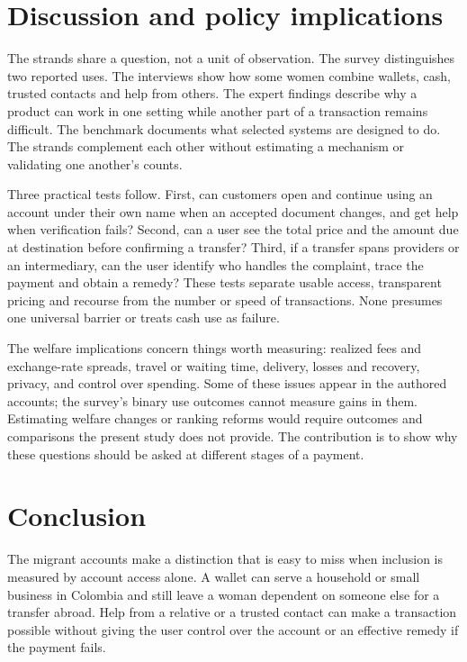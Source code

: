 \documentclass[12pt]{article}
\begin{document}
\section{Discussion and policy implications}
The strands share a question, not a unit of observation. The survey distinguishes two reported uses. The interviews show how some women combine wallets, cash, trusted contacts and help from others. The expert findings describe why a product can work in one setting while another part of a transaction remains difficult. The benchmark documents what selected systems are designed to do. The strands complement each other without estimating a mechanism or validating one another's counts.

Three practical tests follow. First, can customers open and continue using an account under their own name when an accepted document changes, and get help when verification fails? Second, can a user see the total price and the amount due at destination before confirming a transfer? Third, if a transfer spans providers or an intermediary, can the user identify who handles the complaint, trace the payment and obtain a remedy? These tests separate usable access, transparent pricing and recourse from the number or speed of transactions. None presumes one universal barrier or treats cash use as failure.

The welfare implications concern things worth measuring: realized fees and exchange-rate spreads, travel or waiting time, delivery, losses and recovery, privacy, and control over spending. Some of these issues appear in the authored accounts; the survey's binary use outcomes cannot measure gains in them. Estimating welfare changes or ranking reforms would require outcomes and comparisons the present study does not provide. The contribution is to show why these questions should be asked at different stages of a payment.

\section{Conclusion}
The migrant accounts make a distinction that is easy to miss when inclusion is measured by account access alone. A wallet can serve a household or small business in Colombia and still leave a woman dependent on someone else for a transfer abroad. Help from a relative or a trusted contact can make a transaction possible without giving the user control over the account or an effective remedy if the payment fails.
\end{document}
